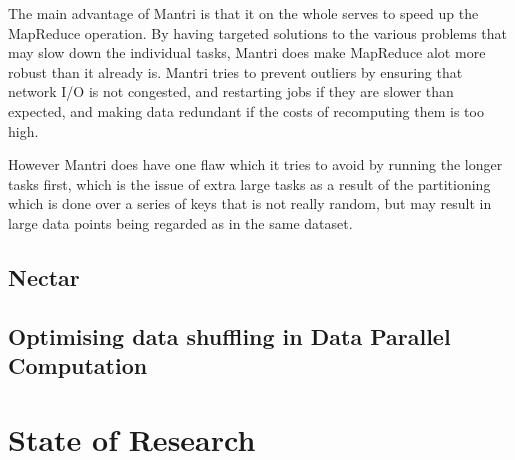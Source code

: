 \documentclass[]{article}
\begin{document}
The main advantage of Mantri is that it on the whole serves to speed up the MapReduce operation. By having targeted solutions to the various problems that may slow down the individual tasks, Mantri does make MapReduce alot more robust than it already is. Mantri tries to prevent outliers by ensuring that network I/O is not congested, and restarting jobs if they are slower than expected, and making data redundant if the costs of recomputing them is too high.

However Mantri does have one flaw which it tries to avoid by running the longer tasks first, which is the issue of extra large tasks as a result of the partitioning which is done over a series of keys that is not really random, but may result in large data points being regarded as in the same dataset.


\subsection{Nectar}

\subsection{Optimising data shuffling in Data Parallel Computation}

\section{State of Research}
\end{document}
